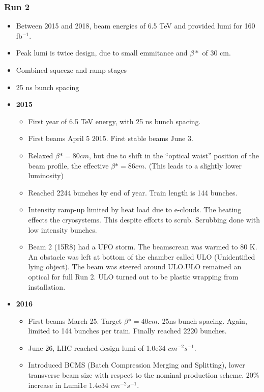 \subsubsection{Run 2}
\begin{itemize}
    \item Between 2015 and 2018, beam energies of 6.5 TeV and provided lumi for 160 fb$^{-1}$. \cite{lhcRun2}
    \item Peak lumi is twice design, due to small emmitance and $\beta*$ of 30 cm. \cite{lhcRun2}
    \item Combined squeeze and ramp stages \cite{lhcRun2}
    \item 25 ns bunch spacing \cite{lhcRun2}
    \item \textbf{2015} \cite{lhcRun2}
    \begin{itemize}
        \item First year of 6.5 TeV energy, with 25 ns bunch spacing. \cite{lhcRun2}
        \item First beams April 5 2015. First stable beams June 3. \cite{lhcRun2}
        \item Relaxed $\beta*=80cm$, but due to shift in the ``optical waist'' position of the beam profile, the effective $\beta*=86cm$. (This leads to a slightly lower luminosity) \cite{lhcRun2}
        \item Reached 2244 bunches by end of year. Train length is 144 bunches. \cite{lhcRun2}
        \item Intensity ramp-up limited by heat load due to e-clouds. The heating effects the cryosystems. This despite efforts to scrub. Scrubbing done with low intensity bunches. \cite{lhcRun2}
        \item Beam 2 (15R8) had a UFO storm. The beamscrean was warmed to 80 K. An obstacle was left at bottom of the chamber called ULO (Unidentified lying object). The beam was steered around ULO.ULO remained an optical for full Run 2. ULO turned out to be plastic wrapping from installation. \cite{lhcRun2}
    \end{itemize}
    \item \textbf{2016} \cite{lhcRun2}
    \begin{itemize}
        \item First beams March 25. Target $\beta*=40cm$. 25ns bunch spacing. Again, limited to 144 bunches per train. Finally reached 2220 bunches. \cite{lhcRun2}
        \item June 26, LHC reached design lumi of 1.0e34 $cm^{-2}s^{-1}$. \cite{lhcRun2}
        \item Introduced BCMS (Batch Compression Merging and Splitting), lower transverse beam size with respect to the nominal production scheme. 20\% increase in Lumi1e 1.4e34 $cm^{-2}s^{-1}$.  \cite{lhcRun2}

\end{itemize}
\end{itemize}
